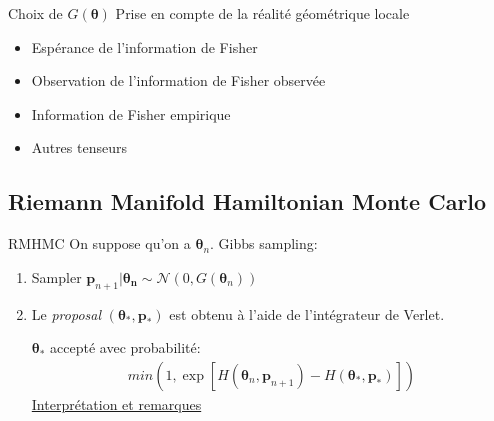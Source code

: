 \documentclass{beamer}
\begin{document}
  \begin{frame}{Choix de $G(\bm{\theta})$}
	Prise en compte de la réalité géométrique locale
	
	\begin{itemize}
	\item Espérance de l'information de Fisher
	\item Observation de l'information de Fisher observée
	\item Information de Fisher empirique
	\item Autres tenseurs
	\end{itemize}
		
	  
  
  
  \end{frame}

  
  
  \subsection{Riemann Manifold Hamiltonian Monte Carlo}
  
  \begin{frame}{RMHMC}
  On suppose qu'on a $\bm{\theta}_n$. Gibbs sampling:
  \begin{enumerate}
    \item Sampler $\bm{p}_{n+1}|\bm{\theta_n} \sim \mathcal{N}(0, G(\bm{\theta}_n))$
    \item Le \textit{proposal} $(\bm{\theta}_{*}, \bm{p}_*)$ est obtenu à l'aide de l'intégrateur de Verlet.
    
    $\bm{\theta}_{*}$ accepté avec probabilité: 
    \begin{align*}
    min(1, \exp[H(\bm{\theta}_n, \bm{p}_{n+1}) 
    - H(\bm{\theta}_*, \bm{p}_*)])
    \end{align*}
    \underline{Interprétation et remarques}
  \end{enumerate}
  \end{frame}  
  
\end{document}
